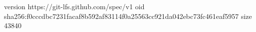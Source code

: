 version https://git-lfs.github.com/spec/v1
oid sha256:f0cccdbc7231facaf8b592af83114f0a25563cc921da042ebc73fc461eaf5957
size 43840
